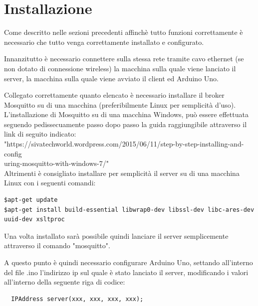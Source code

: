 \documentclass[]{scrartcl}
\begin{document}
\newpage
\section{Installazione}
 
Come descritto nelle sezioni precedenti affinchè tutto funzioni correttamente è necessario che tutto venga correttamente installato e configurato.

Innanzitutto è necessario connettere sulla stessa rete tramite cavo ethernet (se non dotato di connessione wireless) la macchina sulla quale viene lanciato il server, la macchina sulla quale viene avviato il client ed Arduino Uno.

Collegato correttamente quanto elencato è necessario installare il broker Mosquitto su di una macchina (preferibilmente Linux per semplicità d'uso).
L'installazione di Mosquitto su di una macchina Windows, può essere effettuata seguendo pedissecuamente passo dopo passo la guida raggiungibile attraverso il link di seguito indicato:
\\
"https://sivatechworld.wordpress.com/2015/06/11/step-by-step-installing-and-config\\uring-mosquitto-with-windows-7/"
\\

Altrimenti è consigliato installare per semplicità il server su di una macchina Linux con i seguenti comandi:

\begingroup
\fontsize{9.5pt}{8pt}\selectfont
\begin{lstlisting}[frame=single]
$apt-get update
$apt-get install build-essential libwrap0-dev libssl-dev libc-ares-dev uuid-dev xsltproc
\end{lstlisting}
\endgroup

Una volta installato sarà possibile quindi lanciare il server semplicemente attraverso il comando "mosquitto".

A questo punto è quindi necessario configurare Arduino Uno, settando all'interno del file .ino l'indirizzo ip sul quale è stato lanciato il server, modificando i valori all'interno della seguente riga di codice:

\begingroup
\fontsize{9.5pt}{8pt}\selectfont
\begin{verbatim}
  IPAddress server(xxx, xxx, xxx, xxx);
\end{verbatim}
\endgroup
\end{document}
